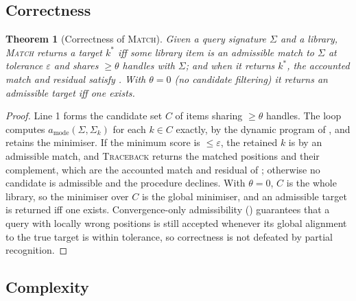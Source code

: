 \documentclass[11pt,twocolumn,a4paper]{article}
\theoremstyle{thmstyle}
\newtheorem{theorem}{Theorem}[section]
\theoremstyle{definition}
\theoremstyle{remark}
\newcommand{\sig}{\Sigma}
\newcommand{\algn}{a}
\newcommand{\eps}{\varepsilon}
\begin{document}
\subsection{Correctness}

\begin{theorem}[Correctness of \textsc{Match}]
\label{thm:correct}
Given a query signature $\sig$ and a library, \textsc{Match} returns a target
$k^{\ast}$ iff some library item is an admissible match to $\sig$ at tolerance
$\eps$ and shares $\ge\theta$ handles with $\sig$; and when it returns
$k^{\ast}$, the accounted match and residual satisfy . With
$\theta=0$ (no candidate filtering) it returns an admissible target iff one
exists.
\end{theorem}

\begin{proof}
Line 1 forms the candidate set $C$ of items sharing $\ge\theta$ handles. The loop
computes $\algn_{\text{mode}}(\sig,\sig_k)$ for each $k\in C$ exactly, by the
dynamic program of , and retains the minimiser. If the
minimum score is $\le\eps$, the retained $k$ is by  an
admissible match, and \textsc{Traceback} returns the matched positions and their
complement, which are the accounted match and residual of ;
otherwise no candidate is admissible and the procedure declines. With $\theta=0$,
$C$ is the whole library, so the minimiser over $C$ is the global minimiser, and
an admissible target is returned iff one exists. Convergence-only admissibility
() guarantees that a query with locally wrong positions
is still accepted whenever its global alignment to the true target is within
tolerance, so correctness is not defeated by partial recognition.
\end{proof}

\subsection{Complexity}
\end{document}
